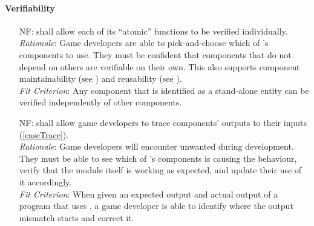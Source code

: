 \paragraph{Verifiability}
\noindent \begin{itemize}[wide=0pt, leftmargin=*]

    \item[NF\refstepcounter{nfnum}\thenfnum \label{N_Atomic}:]  \progname{}
    shall allow each of its ``atomic'' functions to be verified individually.
    \vspace*{1mm}\\
    \textit{Rationale}: Game developers are able to pick-and-choose which of
    \progname{}'s components to use. They must be confident that components
    that do not depend on others are verifiable on their own. This also
    supports component maintainability (see ) and reusability
    (see ). \vspace*{1mm}\\
    \textit{Fit Criterion}: Any \progname{} component that is identified as a
    stand-alone entity can be verified independently of other components.

    \item[NF\refstepcounter{nfnum}\thenfnum \label{N_Trace}:]  \progname{}
    shall allow game developers to trace components' outputs to their inputs
    (\ref{easeTrace}). \vspace*{1mm}\\
    \textit{Rationale}: Game developers will encounter unwanted during
    development. They must be able to see which of \progname{}'s components is
    causing the behaviour, verify that the module itself is working as
    expected, and update their use of it accordingly. \vspace*{1mm}\\
    \textit{Fit Criterion}: When given an expected output and actual output of
    a program that uses \progname{}, a game developer is able to identify where
    the output mismatch starts and correct it.

\end{itemize}


